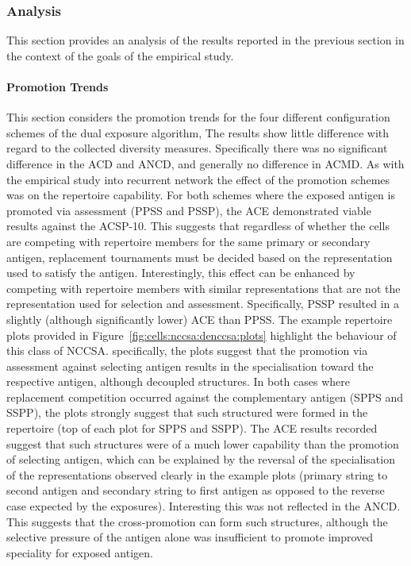 %
%
\subsubsection{Analysis}
This section provides an analysis of the results reported in the previous section in the context of the goals of the empirical study. 

%
%
\paragraph{Promotion Trends}
This section considers the promotion trends for the four different configuration schemes of the dual exposure algorithm,
The results show little difference with regard to the collected diversity measures. Specifically there was no significant difference in the ACD and ANCD, and generally no difference in ACMD.
As with the empirical study into recurrent network the effect of the promotion schemes was on the repertoire capability. For both schemes where the exposed antigen is promoted via assessment (PPSS and PSSP), the ACE demonstrated viable results against the ACSP-10. This suggests that regardless of whether the cells are competing with repertoire members for the same primary or secondary antigen, replacement tournaments must be decided based on the representation used to satisfy the antigen. Interestingly, this effect can be enhanced by competing with repertoire members with similar representations that are not the representation used for selection and assessment. Specifically, PSSP resulted in a slightly (although significantly lower) ACE than PPSS. 
The example repertoire plots provided in Figure~\ref{fig:cells:nccsa:denccsa:plots} highlight the behaviour of this class of NCCSA. specifically, the plots suggest that the promotion via assessment against selecting antigen results in the specialisation toward the respective antigen, although decoupled structures. In both cases where replacement competition occurred against the complementary antigen (SPPS and SSPP), the plots strongly suggest that such structured were formed in the repertoire (top of each plot for SPPS and SSPP). The ACE results recorded suggest that such structures were of a much lower capability than the promotion of selecting antigen, which can be explained by the reversal of the specialisation of the representations observed clearly in the example plots (primary string to second antigen and secondary string to first antigen as opposed to the reverse case expected by the exposures). Interesting this was not reflected in the ANCD. This suggests that the cross-promotion can form such structures, although the selective pressure of the antigen alone was insufficient to promote improved speciality for exposed antigen. 

